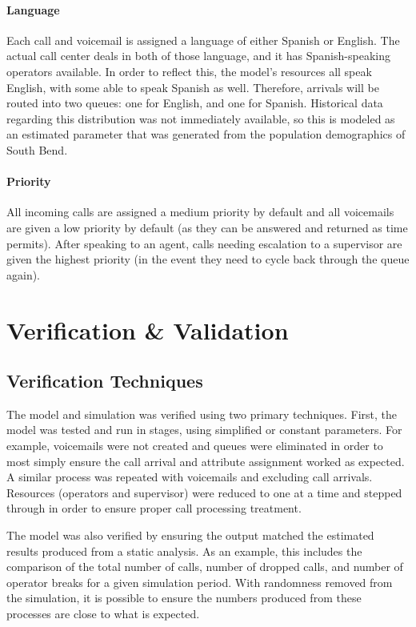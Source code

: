 \documentclass[12pt,twocolumn]{article}
\begin{document}
	\paragraph{Language}

Each call and voicemail is assigned a language of either Spanish or English.  The actual call center deals in both of those language, and it has Spanish-speaking operators available.  In order to reflect this, the model's resources all speak English, with some able to speak Spanish as well.  Therefore, arrivals will be routed into two queues:  one for English, and one for Spanish.  Historical data regarding this distribution was not immediately available, so this is modeled as an estimated parameter that was generated from the population demographics of South Bend.

	\paragraph{Priority}

All incoming calls are assigned a medium priority by default and all voicemails are given a low priority by default (as they can be answered and returned as time permits).  After speaking to an agent, calls needing escalation to a supervisor are given the highest priority (in the event they need to cycle back through the queue again).


\section{Verification \& Validation}

	\subsection{Verification Techniques}

The model and simulation was verified using two primary techniques.  First, the model was tested and run in stages, using simplified or constant parameters.  For example, voicemails were not created and queues were eliminated in order to most simply ensure the call arrival and attribute assignment worked as expected.  A similar process was repeated with voicemails and excluding call arrivals.  Resources (operators and supervisor) were reduced to one at a time and stepped through in order to ensure proper call processing treatment.  

\par

The model was also verified by ensuring the output matched the estimated results produced from a static analysis.  As an example, this includes the comparison of the total number of calls, number of dropped calls, and number of operator breaks for a given simulation period.  With randomness removed from the simulation, it is possible to ensure the numbers produced from these processes are close to what is expected.
	
\end{document}

